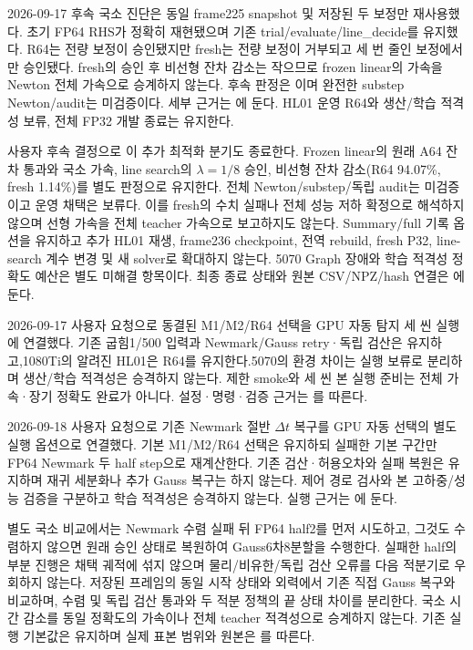 \documentclass[10pt]{article}
\begin{document}
2026-09-17 후속 국소 진단은 동일 frame225 snapshot 및 저장된 두 보정만 재사용했다.
초기 FP64 RHS가 정확히 재현됐으며 기존 trial/evaluate/line\_decide를 유지했다.
R64는 전량 보정이 승인됐지만 fresh는 전량 보정이 거부되고 세 번 줄인 보정에서만 승인됐다.
fresh의 승인 후 비선형 잔차 감소는 작으므로 frozen linear의 가속을 Newton 전체 가속으로 승계하지 않는다.
후속 판정은 이며 완전한 substep Newton/audit는 미검증이다.
세부 근거는 에 둔다.
HL01 운영 R64와 생산/학습 적격성 보류, 전체 FP32 개발 종료는 유지한다.

사용자 후속 결정으로 이 추가 최적화 분기도 종료한다. Frozen linear의 원래 A64 잔차 통과와
국소 가속, line search의 $\lambda=1/8$ 승인, 비선형 잔차 감소(R64 94.07\%, fresh 1.14\%)를
별도 판정으로 유지한다. 전체 Newton/substep/독립 audit는 미검증이고 운영 채택은 보류다.
이를 fresh의 수치 실패나 전체 성능 저하 확정으로 해석하지 않으며 선형 가속을 전체 teacher
가속으로 보고하지도 않는다. Summary/full 기록 옵션을 유지하고 추가 HL01 재생,
frame236 checkpoint, 전역 rebuild, fresh P32, line-search 계수 변경 및 새 solver로 확대하지 않는다.
5070 Graph 장애와 학습 적격성 정확도 예산은 별도 미해결 항목이다.
최종 종료 상태와 원본 CSV/NPZ/hash 연결은
에 둔다.

2026-09-17 사용자 요청으로 동결된 M1/M2/R64 선택을 GPU 자동 탐지 세 씬 실행에 연결했다.
기존 굽힘1/500 입력과 Newmark/Gauss retry·독립 검산은 유지하고,1080Ti의 알려진 HL01은
R64를 유지한다.5070의 환경 차이는 실행 보류로 분리하며 생산/학습 적격성은 승격하지 않는다.
제한 smoke와 세 씬 본 실행 준비는 전체 가속·장기 정확도 완료가 아니다.
설정·명령·검증 근거는
를 따른다.

2026-09-18 사용자 요청으로 기존 Newmark 절반 $\Delta t$ 복구를 GPU 자동 선택의 별도 실행 옵션으로 연결했다.
기본 M1/M2/R64 선택은 유지하되 실패한 기본 구간만 FP64 Newmark 두 half step으로 재계산한다.
기존 검산·허용오차와 실패 복원은 유지하며 재귀 세분화나 추가 Gauss 복구는 하지 않는다.
제어 경로 검사와 본 고하중/성능 검증을 구분하고 학습 적격성은 승격하지 않는다.
실행 근거는 에 둔다.

별도 국소 비교에서는 Newmark 수렴 실패 뒤 FP64 half2를 먼저 시도하고, 그것도 수렴하지
않으면 원래 승인 상태로 복원하여 Gauss6차8분할을 수행한다. 실패한 half의 부분 진행은
채택 궤적에 섞지 않으며 물리/비유한/독립 검산 오류를 다음 적분기로 우회하지 않는다.
저장된 프레임의 동일 시작 상태와 외력에서 기존 직접 Gauss 복구와 비교하며,
수렴 및 독립 검산 통과와 두 적분 정책의 끝 상태 차이를 분리한다.
국소 시간 감소를 동일 정확도의 가속이나 전체 teacher 적격성으로 승계하지 않는다.
기존 실행 기본값은 유지하며 실제 표본 범위와 원본은
를 따른다.
\end{document}
